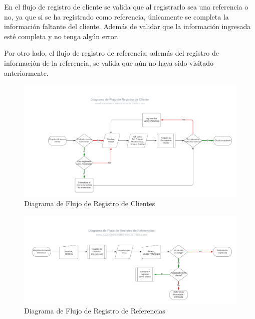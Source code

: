 \documentclass[runningheads]{llncs}
\begin{document}
                En el flujo de registro de cliente se valida que al registrarlo sea una referencia o no, ya que si se ha registrado como referencia, únicamente se completa la información faltante del cliente.
                Además de validar que la información ingresada esté completa y no tenga algún error.

                Por otro lado, el flujo de registro de referencia, además del registro de información de la referencia, se valida que aún no haya sido visitado anteriormente.

                \begin{figure}[H]
                    \centering\captionsetup{width=0.8\textwidth}
                    \includegraphics[width=1\textwidth]{figures/diagramas_de_flujo/Flujo de Registro de Cliente.png}
                    \caption{Diagrama de Flujo de Registro de Clientes} \label{fig3}
                \end{figure}
                \begin{figure}[H]
                    \centering\captionsetup{width=0.8\textwidth}
                    \includegraphics[width=1\textwidth]{figures/diagramas_de_flujo/Flujo de Registro de Referencias.png}
                    \caption{Diagrama de Flujo de Registro de Referencias} \label{fig4}
                \end{figure}
\end{document}
